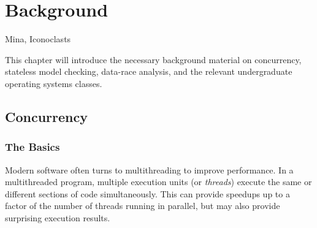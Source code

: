 \chapter{Background}
\label{chap:background}



{Mina, Iconoclasts}

This chapter will introduce the necessary background material on concurrency, stateless model checking, data-race analysis, and the relevant undergraduate operating systems classes.

\section{Concurrency}

\subsection{The Basics}

Modern software often turns to multithreading to improve performance.
In a multithreaded program, multiple execution units (or {\em threads}) execute the same or different sections of code simultaneously.
This can provide speedups up to a factor of the number of threads running in parallel,
but may also provide surprising execution results.

